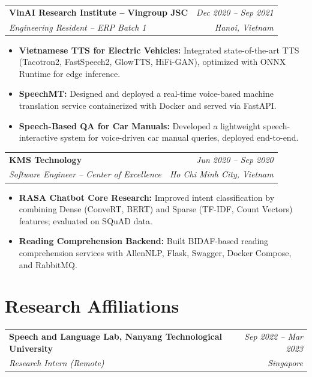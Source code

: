 \documentclass[10pt,a4paper]{article}
\makeatletter
\newcommand{\cventry}[4]{%
  \noindent
  \begin{tabular*}{\linewidth}{@{}l@{\extracolsep{\fill}}r@{}}
    {\color{accent}\textbf{#1}} & \textit{\small #2} \\
    \textit{\small #3} & \textit{\small #4}
  \end{tabular*}%
  \vspace{1pt}%
}
\makeatother
\begin{document}
\vspace{4pt}

\cventry{VinAI Research Institute -- Vingroup JSC}{Dec 2020 -- Sep 2021}
        {Engineering Resident -- ERP Batch 1}{Hanoi, Vietnam}
\begin{itemize}
  \item \textbf{Vietnamese TTS for Electric Vehicles:} Integrated state-of-the-art TTS (Tacotron2, FastSpeech2, GlowTTS, HiFi-GAN), optimized with ONNX Runtime for edge inference.
  \item \textbf{SpeechMT:} Designed and deployed a real-time voice-based machine translation service containerized with Docker and served via FastAPI.
  \item \textbf{Speech-Based QA for Car Manuals:} Developed a lightweight speech-interactive system for voice-driven car manual queries, deployed end-to-end.
\end{itemize}

\vspace{4pt}

\cventry{KMS Technology}{Jun 2020 -- Sep 2020}
        {Software Engineer -- Center of Excellence}{Ho Chi Minh City, Vietnam}
\begin{itemize}
  \item \textbf{RASA Chatbot Core Research:} Improved intent classification by combining Dense (ConveRT, BERT) and Sparse (TF-IDF, Count Vectors) features; evaluated on SQuAD data.
  \item \textbf{Reading Comprehension Backend:} Built BIDAF-based reading comprehension services with AllenNLP, Flask, Swagger, Docker Compose, and RabbitMQ.
\end{itemize}

\section{Research Affiliations}

\cventry{Speech and Language Lab, Nanyang Technological University}{Sep 2022 -- Mar 2023}
        {Research Intern (Remote)}{Singapore}
\vspace{-2pt}{\small Sound event detection in urban areas, project with ST Engineering.}
\end{document}
